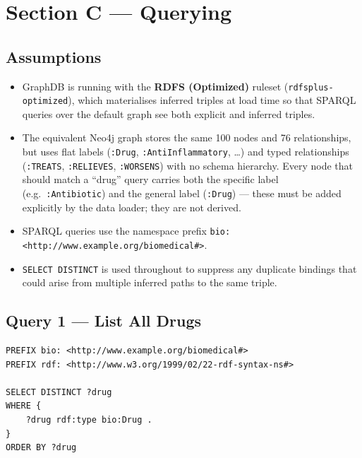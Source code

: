 \documentclass[11pt,a4paper]{article}
\begin{document}
\newpage
\section{Section C — Querying}

\subsection{Assumptions}

\begin{itemize}[noitemsep]
  \item GraphDB is running with the \textbf{RDFS (Optimized)} ruleset
        (\texttt{rdfsplus-optimized}), which materialises inferred triples at
        load time so that SPARQL queries over the default graph see both
        explicit and inferred triples.
  \item The equivalent Neo4j graph stores the same 100 nodes and 76
        relationships, but uses flat labels (\texttt{:Drug},
        \texttt{:AntiInflammatory}, \ldots) and typed relationships
        (\texttt{:TREATS}, \texttt{:RELIEVES}, \texttt{:WORSENS}) with no
        schema hierarchy.  Every node that should match a ``drug'' query carries
        both the specific label (e.g.\ \texttt{:Antibiotic}) and the general
        label (\texttt{:Drug}) — these must be added explicitly by the data
        loader; they are not derived.
  \item SPARQL queries use the namespace prefix
        \texttt{bio: <http://www.example.org/biomedical\#>}.
  \item \texttt{SELECT DISTINCT} is used throughout to suppress any duplicate
        bindings that could arise from multiple inferred paths to the same triple.
\end{itemize}

\subsection{Query 1 — List All Drugs}

\begin{lstlisting}[style=sparql, caption={SPARQL: list all drugs.}]
PREFIX bio: <http://www.example.org/biomedical#>
PREFIX rdf: <http://www.w3.org/1999/02/22-rdf-syntax-ns#>

SELECT DISTINCT ?drug
WHERE {
    ?drug rdf:type bio:Drug .
}
ORDER BY ?drug
\end{lstlisting}
\end{document}
